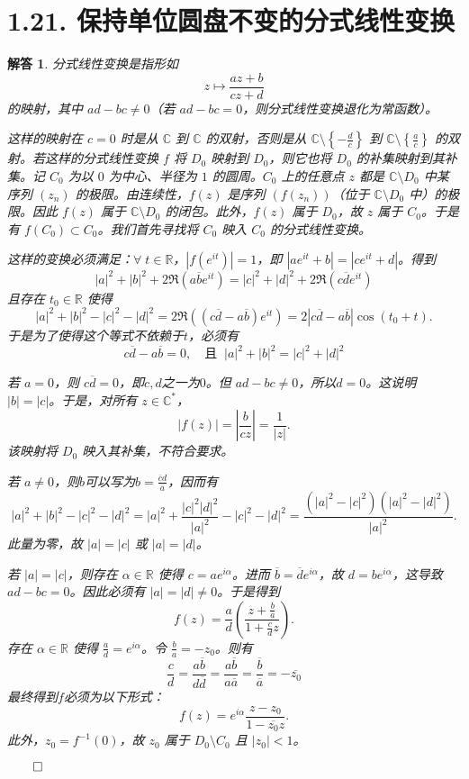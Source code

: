 \documentclass[12pt,UTF8]{ctexbook}
\theoremstyle{exercisestyle}
\theoremstyle{solutionstyle}
\newtheorem*{solution*}{解答}
\newenvironment{solution}
  {\begin{solution*}}
  {\hfill\ensuremath{\qed}\end{solution*}}
\begin{document}
\section{1.21. 保持单位圆盘不变的分式线性变换}
\begin{solution}
分式线性变换是指形如 
$$ z \mapsto \frac{az+b}{cz+d} $$
的映射，其中 \( ad - bc \neq 0 \)（若 \( ad - bc = 0 \)，则分式线性变换退化为常函数）。

这样的映射在 \( c=0 \) 时是从 \( \mathbb{C} \) 到 \( \mathbb{C} \) 的双射，否则是从 \( \mathbb{C} \setminus \left\{ -\frac{d}{c} \right\} \) 到 \( \mathbb{C} \setminus \left\{ \frac{a}{c} \right\} \) 的双射。若这样的分式线性变换 \( f \) 将 \( D_0 \) 映射到 \( D_0 \)，则它也将 \( D_0 \) 的补集映射到其补集。记 \( C_0 \) 为以 \( 0 \) 为中心、半径为 \( 1 \) 的圆周。\( C_0 \) 上的任意点 \( z \) 都是 \( \mathbb{C} \setminus D_0 \) 中某序列 \( (z_n) \) 的极限。由连续性，\( f(z) \) 是序列 \( (f(z_n)) \)（位于 \( \mathbb{C} \setminus D_0 \) 中）的极限。因此 \( f(z) \) 属于 \( \mathbb{C} \setminus D_0 \) 的闭包。此外，\( f(z) \) 属于 \( D_0 \)，故 \( z \) 属于 \( C_0 \)。于是有 \( f(C_0) \subset C_0 \)。我们首先寻找将 \( C_0 \) 映入 \( C_0 \) 的分式线性变换。

这样的变换必须满足：\(\forall\; t \in \mathbb{R} \)，\( |f(e^{it})| = 1 \)，即 \( |a e^{it} + b| = |c e^{it} + d| \)。得到
\[
|a|^2 + |b|^2 + 2 \Re(a \overline{b} e^{it}) = |c|^2 + |d|^2 + 2 \Re(c \overline{d} e^{it})
\]
且存在 \( t_0 \in \mathbb{R} \) 使得
\[
|a|^2 + |b|^2 - |c|^2 - |d|^2 = 2 \Re\left( (c \overline{d} - a \overline{b}) e^{it} \right) = 2 \left| c \overline{d} - a \overline{b} \right| \cos(t_0 + t).
\]
于是为了使得这个等式不依赖于$t$，必须有
\[
c \overline{d} - a \overline{b} = 0 ,\quad \mbox{且}\;\; |a|^2 + |b|^2 = |c|^2 + |d|^2
\]

若 \( a = 0 \)，则 \( c\overline{d} = 0 \)，即$c,d$之一为$0$。但 \( ad - bc \neq 0 \)，所以$d = 0$。这说明 \( |b| = |c| \)。于是，对所有 \( z \in \mathbb{C}^* \)，
\[
|f(z)| = \left| \frac{b}{c z} \right| = \frac{1}{|z|}.
\]
该映射将 \( D_0 \) 映入其补集，不符合要求。

若 \( a \neq 0 \)，则$b$可以写为\(\displaystyle b = \frac{\overline{c} d}{\overline{a}} \)，因而有
\[
|a|^2 + |b|^2 - |c|^2 - |d|^2 = |a|^2 + \frac{|c|^2 |d|^2}{|a|^2} - |c|^2 - |d|^2 = \frac{(|a|^2 - |c|^2)(|a|^2 - |d|^2)}{|a|^2}.
\]
此量为零，故 \( |a| = |c| \) 或 \( |a| = |d| \)。

若 \( |a| = |c| \)，则存在 \( \alpha \in \mathbb{R} \) 使得 \( c = a e^{i\alpha} \)。进而 \( \overline{b} = \overline{d} e^{i\alpha} \)，故 \( d = b e^{i\alpha} \)，这导致 \( ad - bc = 0 \)。因此必须有 \( |a| = |d| \neq 0 \)。于是得到
\[
f(z) = \frac{a}{d} \left( \frac{z + \frac{b}{a}}{1 + \frac{c}{d} z} \right).
\]
存在 \( \alpha \in \mathbb{R} \) 使得 \( \frac{a}{d} = e^{i\alpha} \)。令 \( \frac{b}{a} = -z_0 \)。则有
\[
\frac{c}{d} = \frac{a \overline{b}}{d \overline{d}} = \frac{a \overline{b}}{a \overline{a}} = \frac{\overline{b}}{\overline{a}} = -\overline{z_0}
\]
最终得到$f$必须为以下形式：
\[
f(z) = e^{i\alpha} \frac{z - z_0}{1 - \overline{z_0} z}.
\]
此外，\( z_0 = f^{-1}(0) \)，故 \( z_0 \) 属于 \( D_0 \setminus C_0 \) 且 \( |z_0| < 1 \)。


\end{solution}
\end{document}
